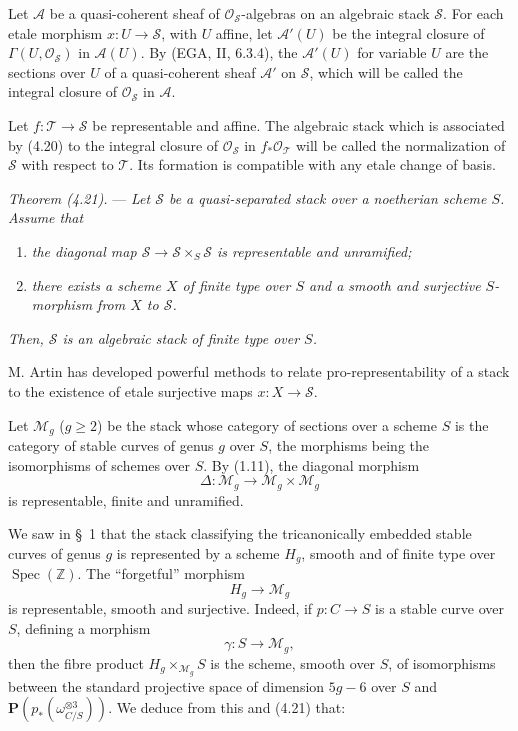 \documentclass[10pt]{article}
\newcommand{\Spec}{\operatorname{Spec}}
\newcommand{\cO}{\mathcal O}
\newcommand{\PP}{\mathbf P}
\begin{document}
Let $\mathscr A$ be a quasi-coherent sheaf of $\cO_{\mathscr S}$-algebras on an algebraic stack $\mathscr S$. For each etale morphism $x:U\to\mathscr S$, with $U$ affine, let $\mathscr A'(U)$ be the integral closure of $\Gamma(U,\cO_{\mathscr S})$ in $\mathscr A(U)$. By (EGA, II, 6.3.4), the $\mathscr A'(U)$ for variable $U$ are the sections over $U$ of a quasi-coherent sheaf $\mathscr A'$ on $\mathscr S$, which will be called the integral closure of $\cO_{\mathscr S}$ in $\mathscr A$.

Let $f:\mathscr T\to\mathscr S$ be representable and affine. The algebraic stack which is associated by (4.20) to the integral closure of $\cO_{\mathscr S}$ in $f_*\cO_{\mathscr T}$ will be called the normalization of $\mathscr S$ with respect to $\mathscr T$. Its formation is compatible with any etale change of basis.

\medskip
\noindent\emph{Theorem (4.21).} --- \emph{Let $\mathscr S$ be a quasi-separated stack over a noetherian scheme $S$. Assume that}
\begin{enumerate}[label=(\roman*)]
\item \emph{the diagonal map $\mathscr S\to\mathscr S\times_S\mathscr S$ is representable and unramified;}
\item \emph{there exists a scheme $X$ of finite type over $S$ and a smooth and surjective $S$-morphism from $X$ to $\mathscr S$.}
\end{enumerate}
\emph{Then, $\mathscr S$ is an algebraic stack of finite type over $S$.}

M. Artin has developed powerful methods to relate pro-representability of a stack to the existence of etale surjective maps $x:X\to\mathscr S$.

\medskip
{}

Let $\mathcal M_g$ ($g\geq 2$) be the stack whose category of sections over a scheme $S$ is the category of stable curves of genus $g$ over $S$, the morphisms being the isomorphisms of schemes over $S$. By (1.11), the diagonal morphism
\[
\Delta:\mathcal M_g\longrightarrow \mathcal M_g\times\mathcal M_g
\]
is representable, finite and unramified.

We saw in \S~1 that the stack classifying the tricanonically embedded stable curves of genus $g$ is represented by a scheme $H_g$, smooth and of finite type over $\Spec(\mathbb Z)$. The ``forgetful'' morphism
\[
H_g\longrightarrow \mathcal M_g
\]
is representable, smooth and surjective. Indeed, if $p:C\to S$ is a stable curve over $S$, defining a morphism
\[
\gamma:S\longrightarrow \mathcal M_g,
\]
then the fibre product $H_g\times_{\mathcal M_g}S$ is the scheme, smooth over $S$, of isomorphisms between the standard projective space of dimension $5g-6$ over $S$ and $\PP(p_*(\omega_{C/S}^{\otimes 3}))$. We deduce from this and (4.21) that:
\end{document}
